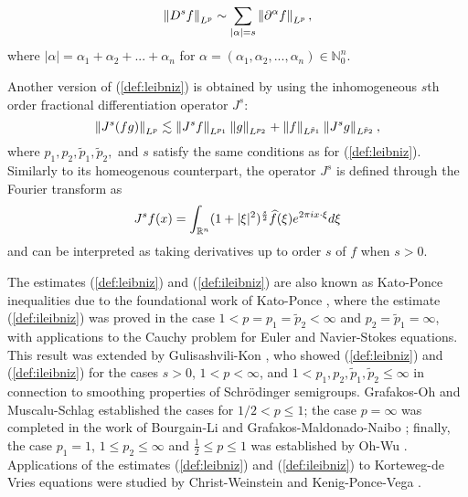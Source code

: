 
\[\left\|D^s f\right\|_{L^p} \sim \sum_{|\alpha| = s} \left\|\partial^\alpha f\right\|_{L^p},\]
where $|\alpha| = \alpha_1 + \alpha_2 + ... + \alpha_n$ for $\alpha = (\alpha_1,\alpha_2,...,\alpha_n) \in \mathbb{N}^n_0.$

 Another version of (\ref{def:leibniz}) is obtained by using the inhomogeneous $s$th order fractional differentiation operator $J^s$:
\begin{equation}\label{def:ileibniz}
\left\|J^s(fg)\right\|_{L^p} \lesssim \left\|J^s f\right\|_{L^{p_1}}\left\|g\right\|_{L^{p_2}} + \left\|f\right\|_{L^{\tilde{p}_1}}\left\|J^s g\right\|_{L^{\tilde{p}_2}},
\end{equation}
where $p_1,p_2,\tilde{p}_1, \tilde{p}_2,$ and $s$ satisfy the same conditions as for (\ref{def:leibniz}).
Similarly to its homeogenous counterpart, the operator $J^s$ is defined through the Fourier transform as 
\[ J^s f(x) = \int_{{{\mathbb R}^n}} (1+|\xi|^2)^\frac{s}{2} \widehat{f}(\xi)e^{2\pi i x\cdot\xi} d\xi\]
and can be interpreted as taking derivatives up to order $s$ of $f$ when $s>0$.


The estimates (\ref{def:leibniz}) and (\ref{def:ileibniz}) are also known as Kato-Ponce inequalities due to the foundational work of Kato-Ponce \cite{MR951744}, where the estimate (\ref{def:ileibniz}) was proved in the case $1<p=p_1=\tilde{p}_2<\infty$ and $p_2=\tilde{p}_1=\infty$, with applications to the Cauchy problem for Euler and Navier-Stokes equations. This result was extended by Gulisashvili-Kon \cite{MR1420922}, who showed (\ref{def:leibniz}) and (\ref{def:ileibniz}) for the cases $s>0$, $1<p<\infty$, and $1 < p_1,p_2,\tilde{p}_1,\tilde{p}_2\leq\infty$ in connection to smoothing properties of Schr\"odinger semigroups. Grafakos-Oh \cite{MR3200091} and Muscalu-Schlag \cite{MR3052499} established the cases for $1/2 <p\leq 1$; the case $p=\infty$ was completed in the work of Bourgain-Li \cite{MR3263081} and Grafakos-Maldonado-Naibo \cite{MR3189525}; finally, the case $p_1 = 1$, $1\leq p_2 \leq \infty$ and $\frac{1}{2} \leq p \leq 1$ was established by Oh-Wu \cite{Oh_Wu}. Applications of the estimates (\ref{def:leibniz}) and (\ref{def:ileibniz}) to Korteweg-de Vries equations were studied by Christ-Weinstein \cite{MR1124294} and Kenig-Ponce-Vega \cite{MR1211741}.

